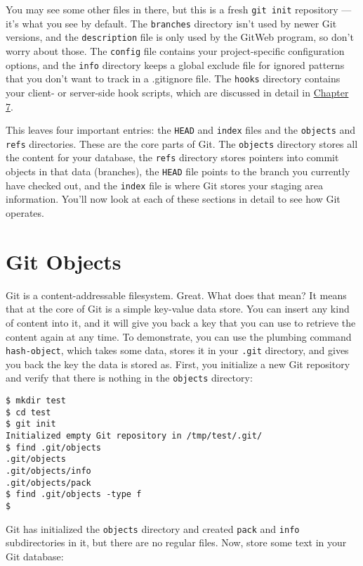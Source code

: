 \documentclass[a4paper]{book}
\newcounter{tab}[chapter]
\newcommand{\prechap}{Chapter }
\newcommand{\postchap}{}
\newcommand{\chapref}[1]{\hyperref[chap:#1]{\prechap #1\postchap}}
\begin{document}
You may see some other files in there, but this is a fresh \texttt{git init} repository --- it's what you see by default. The \texttt{branches} directory isn't used by newer Git versions, and the \texttt{description} file is only used by the GitWeb program, so don't worry about those. The \texttt{config} file contains your project-specific configuration options, and the \texttt{info} directory keeps a global exclude file for ignored patterns that you don't want to track in a .gitignore file. The \texttt{hooks} directory contains your client- or server-side hook scripts, which are discussed in detail in \chapref{7}.

This leaves four important entries: the \texttt{HEAD} and \texttt{index} files and the \texttt{objects} and \texttt{refs} directories. These are the core parts of Git. The \texttt{objects} directory stores all the content for your database, the \texttt{refs} directory stores pointers into commit objects in that data (branches), the \texttt{HEAD} file points to the branch you currently have checked out, and the \texttt{index} file is where Git stores your staging area information. You'll now look at each of these sections in detail to see how Git operates.

\section{Git Objects}

Git is a content-addressable filesystem. Great. What does that mean? It means that at the core of Git is a simple key-value data store. You can insert any kind of content into it, and it will give you back a key that you can use to retrieve the content again at any time. To demonstrate, you can use the plumbing command \texttt{hash-object}, which takes some data, stores it in your \texttt{.git} directory, and gives you back the key the data is stored as. First, you initialize a new Git repository and verify that there is nothing in the \texttt{objects} directory:

\begin{shaded}\begin{verbatim}
$ mkdir test
$ cd test
$ git init
Initialized empty Git repository in /tmp/test/.git/
$ find .git/objects
.git/objects
.git/objects/info
.git/objects/pack
$ find .git/objects -type f
$
\end{verbatim}\end{shaded}

Git has initialized the \texttt{objects} directory and created \texttt{pack} and \texttt{info} subdirectories in it, but there are no regular files. Now, store some text in your Git database:
\end{document}

